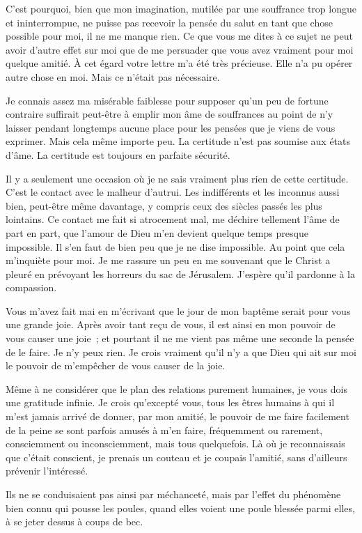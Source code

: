 \documentclass[french,twoside]{book} %
\begin{document}
C'est pourquoi, bien que mon imagination, mutilée par une souffrance trop longue et ininterrompue, ne puisse pas recevoir la pensée du salut en tant que chose possible pour moi, il ne me manque rien. Ce que vous me dites à ce sujet ne peut avoir d'autre effet sur moi que de me persuader que vous avez vraiment pour moi quelque amitié. À cet égard votre lettre m'a été très précieuse. Elle n'a pu opérer autre chose en moi. Mais ce n'était pas nécessaire.\par
Je connais assez ma misérable faiblesse pour supposer qu'un peu de fortune contraire suffirait peut-être à emplir mon âme de souffrances au point de n'y laisser pendant longtemps aucune place pour les pensées que je viens de vous exprimer. Mais cela même importe peu. La certitude n'est pas soumise aux états d'âme. La certitude est toujours en parfaite sécurité.\par
Il y a seulement une occasion où je ne sais vraiment plus rien de cette certitude. C'est le contact avec le malheur d'autrui. Les indifférents et les inconnus aussi bien, peut-être même davantage, y compris ceux des siècles passés les plus lointains. Ce contact me fait si atrocement mal, me déchire tellement l'âme de part en part, que l'amour de Dieu m'en devient quelque temps presque impossible. Il s'en faut de bien peu que je ne dise impossible. Au point que cela m'inquiète pour moi. Je me rassure un peu en me souvenant que le Christ a pleuré en prévoyant les horreurs du sac de Jérusalem. J'espère qu'il pardonne à la compassion.\par
Vous m'avez fait mai en m'écrivant que le jour de mon baptême serait pour vous une grande joie. Après avoir tant reçu de vous, il est ainsi en mon pouvoir de vous causer une joie ; et pourtant il ne me vient pas même une seconde la pensée de le faire. Je n'y peux rien. Je crois vraiment qu'il n'y a que Dieu qui ait sur moi le pouvoir de m'empêcher de vous causer de la joie.\par
Même à ne considérer que le plan des relations purement humaines, je vous dois une gratitude infinie. Je crois qu'excepté vous, tous les êtres humains à qui il m'est jamais arrivé de donner, par mon amitié, le pouvoir de me faire facilement de la peine se sont parfois amusés à m'en faire, fréquemment ou rarement, consciemment ou inconsciemment, mais tous quelquefois. Là où je reconnaissais que c'était conscient, je prenais un couteau et je coupais l'amitié, sans d'ailleurs prévenir l'intéressé.\par
Ils ne se conduisaient pas ainsi par méchanceté, mais par l'effet du phénomène bien connu qui pousse les poules, quand elles voient une poule blessée parmi elles, à se jeter dessus à coups de bec.\par
\end{document}
